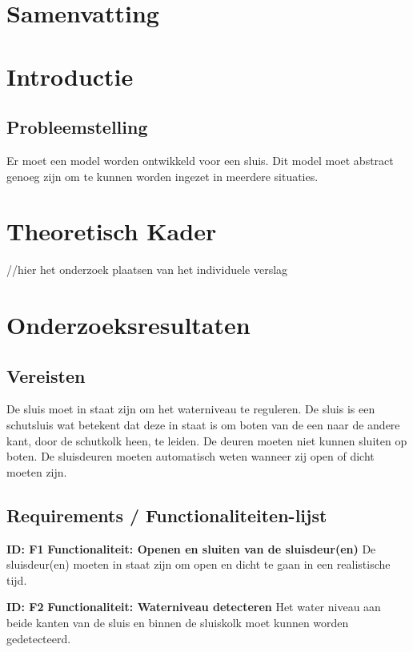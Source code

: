 \documentclass{article}
\begin{document}
\section{Samenvatting}
\section{Introductie}
\subsection{Probleemstelling}
Er moet een model worden ontwikkeld voor een sluis. Dit model moet abstract genoeg zijn om te kunnen worden ingezet in meerdere situaties.
\section{Theoretisch Kader}
//hier het onderzoek plaatsen van het individuele verslag
\section{Onderzoeksresultaten}

\subsection{Vereisten}

De sluis moet in staat zijn om het waterniveau te reguleren. De sluis is een schutsluis wat betekent dat deze in staat is om boten van de een naar de andere kant, door de schutkolk heen, te leiden. De deuren moeten niet kunnen sluiten op boten. De sluisdeuren moeten automatisch weten wanneer zij open of dicht moeten zijn.


\subsection{Requirements / Functionaliteiten-lijst}
\textbf{ID: F1} \newline
\textbf{Functionaliteit: Openen en sluiten van de sluisdeur(en)} \newline
De sluisdeur(en) moeten in staat zijn om open en dicht te gaan in een realistische tijd. \newline

\textbf{ID: F2} \newline
\textbf{Functionaliteit: Waterniveau detecteren} \newline
Het water niveau aan beide kanten van de sluis en binnen de sluiskolk moet kunnen worden gedetecteerd. \newline
\end{document}
